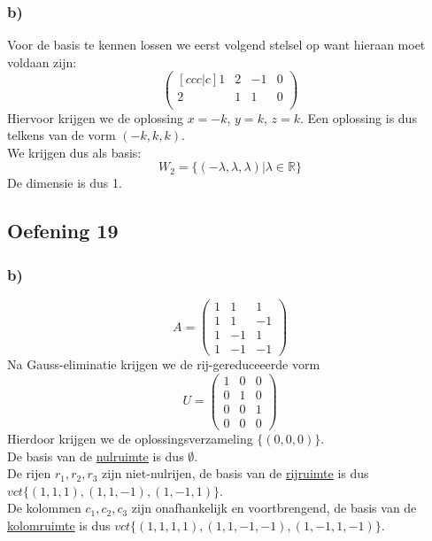 \documentclass[lineaire_algebra_oplossingen.tex]{subfiles}
\begin{document}
\subsubsection*{b)}
Voor de basis te kennen lossen we eerst volgend stelsel op want hieraan moet voldaan zijn:
$$
\begin{pmatrix}[c c c | c]
1 & 2&-1&0\\
2&1&1&0\\
\end{pmatrix}
$$
Hiervoor krijgen we de oplossing $x=-k$, $y= k$, $z=k$. Een oplossing is dus telkens van de vorm $(-k,k,k)$.\\
We krijgen dus als basis:
$$W_2 = \{(-\lambda, \lambda, \lambda)|\lambda \in \mathbb{R}\}$$
De dimensie is dus 1.
\subsection{Oefening 19}
\subsubsection*{b)}
\[ A =
\begin{pmatrix}
  1 & 1 & 1\\
  1 & 1 & -1\\
  1 & -1 & 1\\
  1 & -1 & -1
\end{pmatrix}
\]
Na Gauss-eliminatie krijgen we de rij-gereduceeerde vorm
\[ U =
\begin{pmatrix}
  1 & 0 & 0\\
  0 & 1 & 0\\
  0 & 0 & 1\\
  0 & 0 & 0
\end{pmatrix}
\]
Hierdoor krijgen we de oplossingsverzameling $\{(0,0,0)\}$.\\
De basis van de \underline{nulruimte} is dus $\emptyset$.\\
De rijen $r_1, r_2, r_3$ zijn niet-nulrijen, de basis van de \underline{rijruimte} is dus $vct\{(1,1,1), (1,1,-1), (1,-1,1)\}$.\\
De kolommen $c_1, c_2, c_3$ zijn onafhankelijk en voortbrengend, de basis van de \underline{kolomruimte} is dus $vct\{(1,1,1,1), (1,1,-1,-1), (1,-1,1,-1)\}$.
\end{document}

